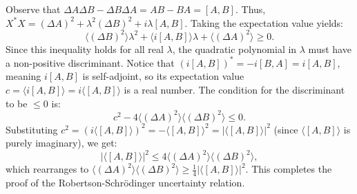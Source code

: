 \documentclass{article}
\begin{document}
\begin{enumerate}[label=\fbox{\arabic*}]
\begin{enumerate}[label=(\arabic*)]
                Observe that $\Delta A \Delta B - \Delta B \Delta A = AB - BA = [A, B]$.
                Thus, $X^* X = (\Delta A)^2 + \lambda^2 (\Delta B)^2 + i \lambda [A, B]$.
                Taking the expectation value yields:
                \[
                  \langle (\Delta B)^2 \rangle \lambda^2 + \langle i [A, B] \rangle \lambda + \langle (\Delta A)^2 \rangle \ge 0.
                \]
                Since this inequality holds for all real $\lambda$, the quadratic polynomial in $\lambda$ must have a non-positive discriminant.
                Notice that $(i [A, B])^* = -i [B, A] = i [A, B]$, meaning $i [A, B]$ is self-adjoint, so its expectation value $c = \langle i [A, B] \rangle = i \langle [A, B] \rangle$ is a real number.
                The condition for the discriminant to be $\le 0$ is:
                \[
                  c^2 - 4 \langle (\Delta A)^2 \rangle \langle (\Delta B)^2 \rangle \le 0.
                \]
                Substituting $c^2 = (i \langle [A, B] \rangle)^2 = - \langle [A, B] \rangle^2 = |\langle [A, B] \rangle|^2$ (since $\langle [A, B] \rangle$ is purely imaginary), we get:
                \[
                  |\langle [A, B] \rangle|^2 \le 4 \langle (\Delta A)^2 \rangle \langle (\Delta B)^2 \rangle,
                \]
                which rearranges to $\langle (\Delta A)^2 \rangle \langle (\Delta B)^2 \rangle \ge \frac{1}{4} |\langle [A, B] \rangle|^2$. This completes the proof of the Robertson-Schrödinger uncertainty relation.
        \end{enumerate}

\end{enumerate}
\end{document}
